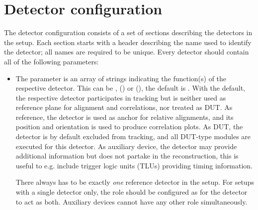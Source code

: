 \section{Detector configuration}
\label{sec:detector_config}
The detector configuration consists of a set of sections describing the detectors in the setup.
Each section starts with a header describing the name used to identify the detector; all names are required to be unique.
Every detector should contain all of the following parameters:
\begin{itemize}
\item The  parameter is an array of strings indicating the function(s) of the respective detector. This can be ,  () or  (), the default is . With the default, the respective detector participates in tracking but is neither used as reference plane for alignment and correlations, nor treated as DUT. As reference, the detector is used as anchor for relative alignments, and its position and orientation is used to produce correlation plots. As DUT, the detector is by default excluded from tracking, and all DUT-type modules are executed for this detector. As auxiliary device, the detector may provide additional information but does not partake in the reconstruction, this is useful to e.g. include trigger logic units (TLUs) providing timing information.
\begin{warning}
There always has to be exactly \emph{one} reference detector in the setup. For setups with a single detector only, the role should be configured as  for the detector to act as both. Auxiliary devices cannot have any other role simultaneously.
\end{warning}


\end{itemize}
